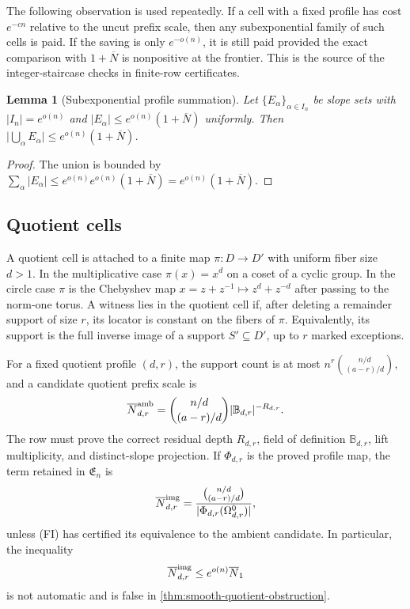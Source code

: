 \documentclass[12pt,a4paper]{amsart}
\numberwithin{equation}{section}
\newtheorem{lemma}[lemma]{Lemma}
\theoremstyle{remark}
\newcommand{\B}{\mathbb B}
\newcommand{\barN}{\overline N}
\newcommand{\abs}[1]{\lvert #1\rvert}
\begin{document}
The following observation is used repeatedly.  If a cell with a fixed
profile has cost \(e^{-c n}\) relative to the uncut prefix scale, then any
subexponential family of such cells is paid.  If the saving is only
\(e^{-o(n)}\), it is still paid provided the exact comparison with
\(1+\barN\) is nonpositive at the frontier.  This is the source of the
integer-staircase checks in finite-row certificates.

\begin{lemma}[Subexponential profile summation]\label{lem:profile-summation}
Let \(\{E_\alpha\}_{\alpha\in I_n}\) be slope sets with
\(\abs{I_n}=e^{o(n)}\) and
\(\abs{E_\alpha}\le e^{o(n)}(1+\barN)\) uniformly.  Then
\(\abs{\bigcup_{\alpha}E_\alpha}\le e^{o(n)}(1+\barN)\).
\end{lemma}

\begin{proof}
The union is bounded by
\(\sum_\alpha\abs{E_\alpha}\le
e^{o(n)}e^{o(n)}(1+\barN)=e^{o(n)}(1+\barN)\).
\end{proof}

\subsection*{Quotient cells}
A quotient cell is attached to a finite map \(\pi:D\to D'\) with uniform fiber size \(d>1\).  In the multiplicative case \(\pi(x)=x^d\) on a coset of a cyclic group.  In the circle case \(\pi\) is the Chebyshev map \(x=z+z^{-1}\mapsto z^d+z^{-d}\) after passing to the norm-one torus.  A witness lies in the quotient cell if, after deleting a remainder support of size \(r\), its locator is constant on the fibers of \(\pi\).  Equivalently, its support is the full inverse image of a support \(S'\subseteq D'\), up to \(r\) marked exceptions.

For a fixed quotient profile \((d,r)\), the support count is at most
\(n^r\binom {n/d}{(a-r)/d}\), and a candidate quotient prefix scale is
\[
 \barN^{\rm amb}_{d,r}=\binom{n/d}{(a-r)/d}
 \abs{\B_{d,r}}^{-R_{d,r}}.
\]
The row must prove the correct residual depth \(R_{d,r}\), field of
definition \(\B_{d,r}\), lift multiplicity, and distinct-slope projection.
If \(\Phi_{d,r}\) is the proved profile map, the term retained in
\(\mathfrak E_n\) is
\[
 \barN^{\rm img}_{d,r}
 =\frac{\binom{n/d}{(a-r)/d}}
        {\abs{\Phi_{d,r}(\Omega^0_{d,r})}},
\]
unless \textup{(FI)} has certified its equivalence to the ambient
candidate.  In particular, the
inequality
\[
   \barN^{\rm img}_{d,r}\le e^{o(n)}\barN_1
\]
is not automatic and is false in \cref{thm:smooth-quotient-obstruction}.
\end{document}
